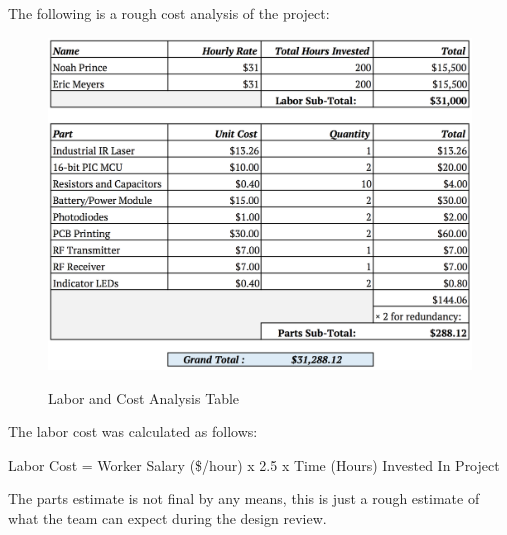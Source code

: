 \documentclass[openbib,letterpaper,10pt]{article}
\begin{document}
\begin{spacing}{1.15}
The following is a rough cost analysis of the project: 
\begin{figure} [H]
	\centering
	\includegraphics[scale=0.4]{cost-labor-table.png}
	\label{fig:brequirements-table}
	\caption{Labor and Cost Analysis Table}
\end{figure}
\vspace{-5mm}
The labor cost was calculated as follows:

\begin{center}
	Labor Cost = Worker Salary (\$/hour) x 2.5 x Time (Hours) Invested In Project
\end{center}

The parts estimate is not final by any means, this is just a rough estimate of what the team can expect during the design review.  



\clearpage
\end{spacing}
\end{document}

